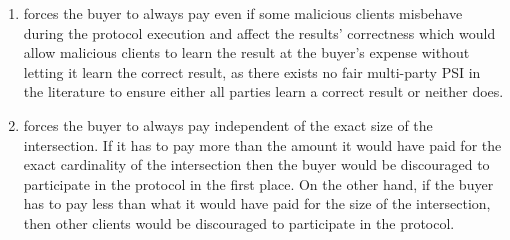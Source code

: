 \begin{enumerate}
\item forces the buyer to always pay even if some malicious clients misbehave during the protocol execution and affect the results' correctness which would allow malicious clients to learn the result at the buyer's expense without letting it learn the correct result, as there exists no fair multi-party PSI in the literature to ensure either all parties learn a correct result or neither does. 

\item forces the buyer to always pay independent of the exact size of the intersection. If it has to pay more than the amount it would have paid for the exact cardinality of the intersection then the buyer would be discouraged to participate in the protocol in the first place. On the other hand, if the buyer has to pay less than what it would have paid for the size of the intersection, then other clients would be discouraged to participate in the protocol. 

\end{enumerate}






 





